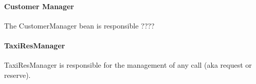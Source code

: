 \paragraph{Customer Manager} %
\label{par:customer_manager}
The CustomerManager bean is responsible ????
\begin{table}[h!]
\centering
{}
\end{table}

\paragraph{TaxiResManager} %
\label{par:taxiresmanager}
TaxiResManager is responsible for the management of any call (aka request or reserve).

